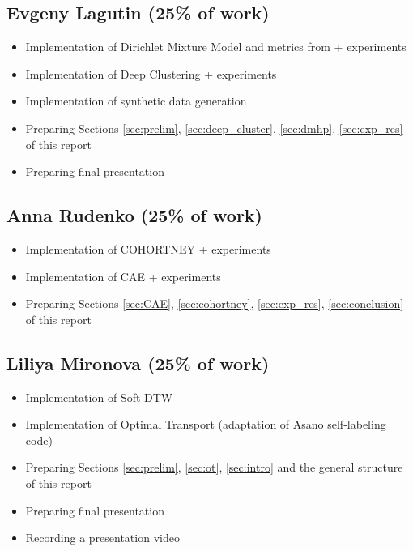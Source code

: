 \documentclass[10pt]{article}
\begin{document}
\subsection*{Evgeny Lagutin (25\% of work)}
\begin{itemize}
    \item Implementation of Dirichlet Mixture Model and metrics from \cite{123dirichlet} + experiments
    \item Implementation of Deep Clustering + experiments
    \item Implementation of synthetic data generation
    \item Preparing Sections \ref{sec:prelim}, \ref{sec:deep_cluster}, \ref{sec:dmhp}, \ref{sec:exp_res}    of this report
    \item Preparing final presentation
\end{itemize}

\subsection*{Anna Rudenko (25\% of work)}
\begin{itemize}
    \item Implementation of COHORTNEY + experiments
    \item Implementation of CAE + experiments
    \item Preparing Sections \ref{sec:CAE}, \ref{sec:cohortney}, \ref{sec:exp_res}, \ref{sec:conclusion} of this report
\end{itemize}

\subsection*{Liliya Mironova (25\% of work)}
\begin{itemize}
    \item Implementation of Soft-DTW
    \item Implementation of Optimal Transport (adaptation of Asano self-labeling code)
    \item Preparing Sections \ref{sec:prelim}, \ref{sec:ot}, \ref{sec:intro} and the general structure of this report
    \item Preparing final presentation
    \item Recording a presentation video
\end{itemize}

\clearpage
\end{document}
